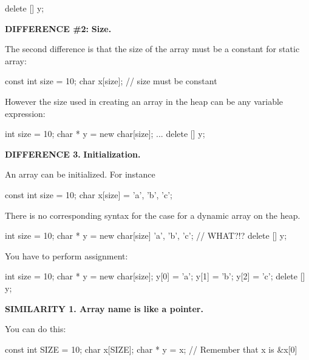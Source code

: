 \begin{consolethree}[escapeinside=||]
delete [] y;
\end{consolethree}

\textbf{DIFFERENCE \#2:} \textbf{Size.}

The second difference is that the size of the array must be a constant
for static array:

\begin{consolethree}[escapeinside=||]
const int size = 10;
char x[size]; // size must be constant
\end{consolethree}

However the size used in creating an array in the heap can be any
variable expression:

\begin{consolethree}[escapeinside=||]
int size = 10;
char * y = new char[size];
...
delete [] y;
\end{consolethree}

\textbf{DIFFERENCE 3.} \textbf{Initialization.}

An array can be initialized. For instance

\begin{consolethree}[escapeinside=||]
const int size = 10;
char x[size] = {'a', 'b', 'c'};
\end{consolethree}

There is no corresponding syntax for the case for a dynamic array on the heap.

\begin{consolethree}[escapeinside=||]
int size = 10;
char * y = new char[size] {'a', 'b', 'c'}; // WHAT?!?
delete [] y;
\end{consolethree}

You have to perform assignment:

\begin{consolethree}[escapeinside=||]
int size = 10;
char * y = new char[size];
y[0] = 'a';
y[1] = 'b';
y[2] = 'c';
delete [] y;
\end{consolethree}


\textbf{SIMILARITY 1. Array name is like a pointer.}

You can do this:

\begin{consolethree}[escapeinside=||]
const int SIZE = 10;
char x[SIZE];
char * y = x; // Remember that x is &x[0]
\end{consolethree}


